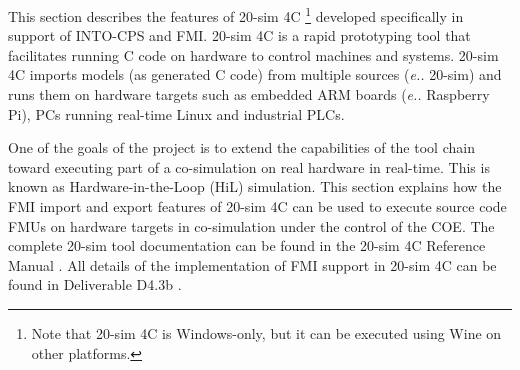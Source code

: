 This section describes the features of {20-sim 4C} \cite{20sim4C} \footnote{Note that 20-sim 4C is Windows-only, but it can be executed using Wine \cite{winehq2016} on other platforms.} developed specifically in support of INTO-CPS and FMI.
%
{20-sim 4C} is a rapid prototyping tool that facilitates running C code on hardware to control machines and systems.
%
{20-sim 4C} imports models (as generated C code) from multiple sources (\emph{e.\@g.\@} 20-sim) and runs them on hardware targets such as embedded ARM boards (\emph{e.\@g.\@} Raspberry Pi), PCs running real-time Linux and industrial PLCs.

One of the goals of the \into project is to extend the capabilities of the \into tool chain toward executing part of a co-simulation on real hardware in real-time.
%
This is known as Hardware-in-the-Loop (HiL) simulation.
%
This section explains how the FMI import and export features of {20-sim 4C} can be used to execute source code FMUs on hardware targets in co-simulation under the control of the COE.
%
The complete {20-sim} tool documentation can be found in the {20-sim 4C} Reference Manual \cite{20sim4CManual13a}.
%
All details of the implementation of FMI support in 20-sim 4C can be found in Deliverable D4.3b \cite{INTOCPSD4.3b}.
%
%
%
